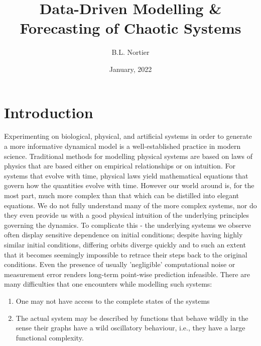 \documentclass[a4paper,12pt,twoside]{report}
\begin{document}
\title{Data-Driven Modelling \& \\ Forecasting of Chaotic Systems}



\author{B.L. Nortier} 
\date{January, 2022}
\date{}
\maketitle
\tableofcontents


\chapter{Introduction}\label{ch1}

Experimenting on biological, physical, and artificial systems in order to generate a more informative dynamical model is a well-established practice in modern science. Traditional methods for modelling physical systems are based on laws of physics that are based either on empirical relationships or on intuition. For systems that evolve with time, physical laws yield mathematical equations that govern how the quantities evolve with time. However our world around is, for the most part, much more complex than that which can be distilled into elegant equations. We do not fully understand many of the more complex systems, nor do they even provide us with a good physical intuition of the underlying principles governing the dynamics. 
To complicate this - the underlying systems we observe often display sensitive dependence on initial conditions; despite having highly similar initial conditions, differing orbits diverge quickly and to such an extent that it becomes seemingly impossible to retrace their steps back to the original conditions. Even the presence of usually 'negligible' computational noise or measurement error renders long-term point-wise prediction infeasible. 
There are many difficulties that one encounters while modelling such systems:
\vspace{-8mm}
\begin{enumerate}[noitemsep, label=\roman*.]
  \item One may not have access to the complete states of the systems
  \item The actual system may be described by functions that behave wildly in the sense their graphs have a wild oscillatory behaviour, i.e., they have a large functional complexity.    
\end{enumerate}
\end{document}
